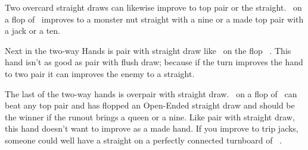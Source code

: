 Two overcard straight draws can likewise improve to top pair or the
straight. \Jh\tenc\ on a flop of \eigh\sevc\tres\ improves to a monster
nut straight with a nine or a made top pair with a jack or a ten.

Next in the two-way Hands is pair with straight draw like
\tend\nined\ on the flop \tenc\eigh\sevs\ . This hand
isn't as good as pair with flush draw; because if the turn improves
the hand to two pair it can improves the enemy to a straight.

The last of the two-way hands is overpair with straight
draw. \Js\Jc\ on a flop of \tenc\nineh\eigs\ can beat any top pair
and has flopped an Open-Ended straight draw and should be the winner
if the runout brings a queen or a nine. Like pair with straight draw,
this hand doesn't want to improve as a made hand. If you improve to
trip jacks, someone could well have a straight on a perfectly
connected turnboard of \tenc\nineh\eigs\Jh\ .






